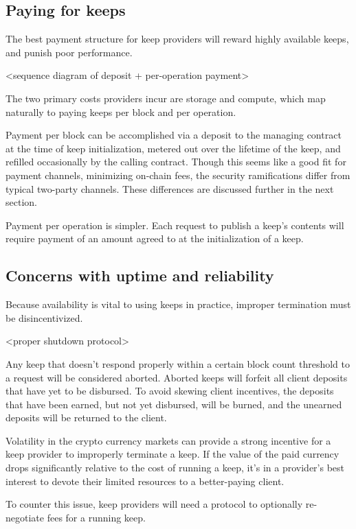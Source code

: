\documentclass[11pt]{article}
\begin{document}
\subsection{Paying for keeps}

The best payment structure for keep providers will reward highly
available keeps, and punish poor performance.

<sequence diagram of deposit + per-operation payment>

The two primary costs providers incur are storage and compute, which
map naturally to paying keeps per block and per operation.

Payment per block can be accomplished via a deposit to the managing
contract at the time of keep initialization, metered out over the
lifetime of the keep, and refilled occasionally by the calling
contract. Though this seems like a good fit for payment channels,
minimizing on-chain fees, the security ramifications differ from
typical two-party channels. These differences are discussed further in
the next section.

Payment per operation is simpler. Each request to publish a keep's
contents will require payment of an amount agreed to at the
initialization of a keep.

\subsection{Concerns with uptime and reliability} \label{uptime}

Because availability is vital to using keeps in practice, improper
termination must be disincentivized.

<proper shutdown protocol>

Any keep that doesn't respond properly within a certain block count
threshold to a request will be considered aborted. Aborted keeps will
forfeit all client deposits that have yet to be disbursed. To avoid
skewing client incentives, the deposits that have been earned, but not
yet disbursed, will be burned, and the unearned deposits will be
returned to the client.

Volatility in the crypto currency markets can provide a strong
incentive for a keep provider to improperly terminate a keep. If the
value of the paid currency drops significantly relative to the cost of
running a keep, it's in a provider's best interest to devote their
limited resources to a better-paying client.

To counter this issue, keep providers will need a protocol to
optionally re-negotiate fees for a running keep.
\end{document}
